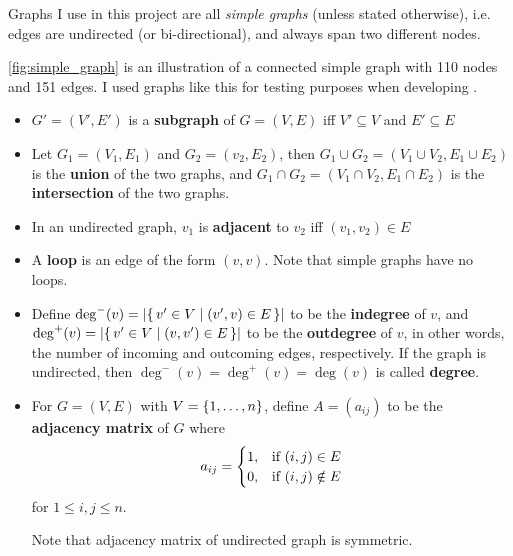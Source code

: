 Graphs I use in this project are all \textsl{simple graphs} (unless stated otherwise), i.e. edges are undirected (or bi-directional), and always span two different nodes.



\autoref{fig:simple_graph} is an illustration of a connected simple graph with 110 nodes and 151 edges.
I used graphs like this for testing purposes when developing \graffs.

\begin{definition}
    \begin{itemize}[leftmargin=*]
        \item $G' = (V', E')$ is a \textbf{subgraph} of $G = (V, E)$ iff $V' \subseteq V$ and $E' \subseteq E$
        \item Let $G_1 = (V_1, E_1)$ and $G_2 = (v_2, E_2)$, then $G_1 \cup G_2 = (V_1 \cup V_2, E_1 \cup E_2)$ is the \textbf{union} of the two graphs, and $G_1 \cap G_2 = (V_1 {\cap} V_2, E_1 {\cap} E_2)$ is the \textbf{intersection} of the two graphs.
    \end{itemize}
\end{definition}

\begin{definition}
    \begin{itemize}[leftmargin=*]
        \item In an undirected graph, $v_1$ is \textbf{adjacent} to $v_2$ iff $(v_1, v_2) \in E$
        \item A \textbf{loop} is an edge of the form $(v, v)$.
        Note that simple graphs have no loops.
        \item Define $\deg^-(v) = \left\lvert \left\{\, v' \in V \mid (v', v) \in E \, \right\} \right\rvert$ to be the \textbf{indegree} of $v$, and $\deg^+(v) = \left\lvert \left\{\, v' \in V \mid (v, v') \in E \, \right\} \right\rvert$ to be the \textbf{outdegree} of $v$, in other words, the number of incoming and outcoming edges, respectively.
        If the graph is undirected, then $\deg^-(v) = \deg^+(v) = \deg(v)$ is called \textbf{degree}.
        \item For $G = (V, E)$ with $V = \left\{1, \dots, n\right\}$, define $A = (a_{ij})$ to be the \textbf{adjacency matrix} of $G$ where
        \[ a_{ij} = \begin{cases}
                        1, & \textnormal{if}\ (i, j) \in E \\
                        0, & \textnormal{if}\ (i, j) \notin E
        \end{cases} \]
        for $1 \leq i, j \leq n$.

        Note that adjacency matrix of undirected graph is symmetric.
    \end{itemize}
\end{definition}

